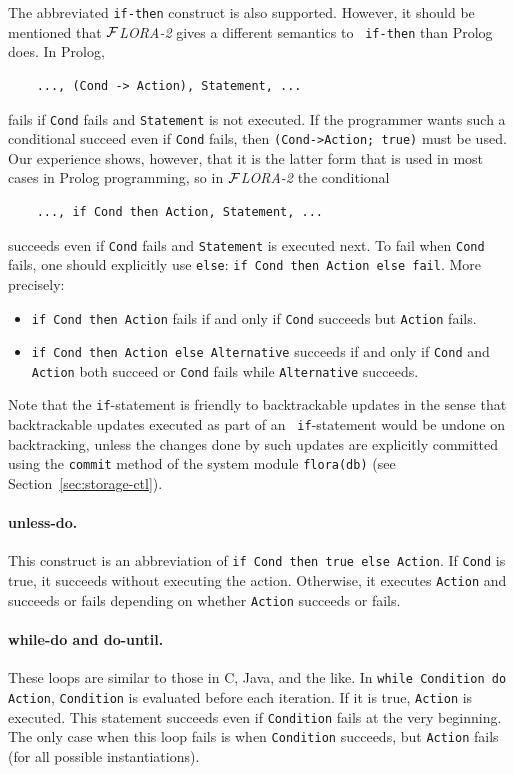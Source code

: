 \documentclass[11pt]{article}
\newcommand{\FLORA}{{\mbox{${\cal F}${\small\it LORA}\rm\emph{-2}}}\xspace}
\begin{document}
The abbreviated {\tt if-then} construct is also supported.  However, it
should be mentioned that \FLORA gives a different semantics to {\tt
  if-then} than Prolog does. In Prolog,
\begin{verbatim}
    ..., (Cond -> Action), Statement, ...  
\end{verbatim}
fails if {\tt Cond} fails and {\tt Statement} is not executed. If the
programmer wants such a conditional succeed even if {\tt Cond} fails, then
{\tt (Cond->Action; true)} must be used. Our experience shows, however,
that it is the latter form that is used in most cases in Prolog
programming, so in \FLORA the conditional
\begin{verbatim}
    ..., if Cond then Action, Statement, ...  
\end{verbatim}
succeeds even if {\tt Cond} fails and {\tt Statement} is executed next. To
fail when {\tt Cond} fails, one should explicitly use {\tt else}:
{\tt if Cond then Action else fail}. More precisely:
\begin{itemize}
  \item  {\tt if Cond then Action} fails if and only if {\tt Cond} succeeds
    but {\tt Action} fails.
  \item {\tt if Cond then Action else Alternative} succeeds if and only if 
    {\tt Cond} and {\tt Action} both succeed or {\tt Cond} fails while
    {\tt Alternative} succeeds.
\end{itemize}

Note that the {\tt if}-statement is friendly to backtrackable updates in
the sense that backtrackable updates executed as part of an {\tt
  if}-statement would be undone on backtracking, unless the changes done by
such updates are explicitly committed using the {\tt commit} method of the
system module {\tt flora(db)} (see Section~\ref{sec:storage-ctl}).

\paragraph{unless-do.}
This construct is an abbreviation of {\tt if Cond then true else Action}.
If {\tt Cond} is true, it succeeds without executing the action.
Otherwise, it executes {\tt Action} and succeeds or fails depending on
whether {\tt Action} succeeds or fails.

\paragraph{while-do and do-until.}
These loops are similar to those in C, Java, and the like.
In {\tt while Condition do Action}, {\tt Condition} is evaluated before each
iteration. If it is true, {\tt Action} is executed. This statement succeeds
even if {\tt Condition} fails at the very beginning. The only case when this
loop fails is when {\tt Condition} succeeds, but {\tt Action} fails (for all
possible instantiations).
\end{document}
